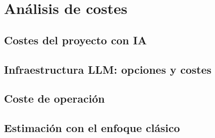 \chapter{Análisis de costes}\label{cap:Costes}

\section{Costes del proyecto con IA}\label{sec:CostesIA}

\section{Infraestructura LLM: opciones y costes}\label{sec:InfraLLM}

\section{Coste de operación}\label{sec:CosteOperacion}

\section{Estimación con el enfoque clásico}\label{sec:EstimacionClasica}

